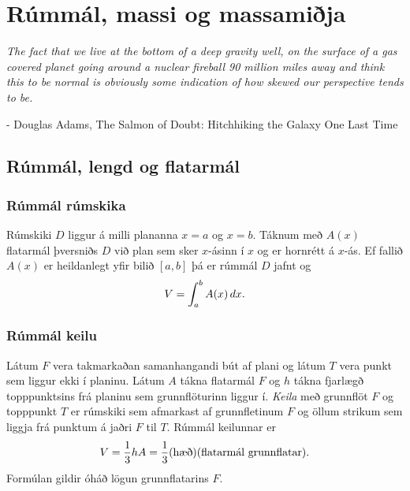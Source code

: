 \documentclass[b5paper,10pt,icelandic]{sphinxmanual}
\begin{document}
\chapter{Rúmmál, massi og massamiðja}
\label{kafli07::doc}\label{kafli07:rummal-massi-og-massamija}
\emph{The fact that we live at the bottom of a deep gravity well, on the surface of a
gas covered planet going around a nuclear fireball 90 million miles away and think
this to be normal is obviously some indication of how skewed our perspective tends to be.}

- Douglas Adams, The Salmon of Doubt: Hitchhiking the Galaxy One Last Time


\section{Rúmmál, lengd og flatarmál}
\label{kafli07:rummal-lengd-og-flatarmal}\label{kafli07:index-1}

\subsection{Rúmmál rúmskika}
\label{kafli07:rummal-rumskika}
Rúmskiki \(D\) liggur á milli plananna \(x=a\) og \(x=b\).
Táknum með \(A(x)\) flatarmál þversniðs \(D\) við plan sem sker
\(x\)-ásinn í \(x\) og er hornrétt á \(x\)-ás. Ef fallið
\(A(x)\) er heildanlegt yfir bilið \([a, b]\) þá er rúmmál
\(D\) jafnt og
\begin{gather}
\begin{split}V=\int_a^b A(x)\,dx.\end{split}\notag
\end{gather}

\subsection{Rúmmál keilu}
\label{kafli07:index-2}\label{kafli07:rummal-keilu}
Látum \(F\) vera takmarkaðan samanhangandi bút af plani og látum
\(T\) vera punkt sem liggur ekki í planinu. Látum \(A\) tákna
flatarmál \(F\) og \(h\) tákna fjarlægð topppunktsins frá
planinu sem grunnflöturinn liggur í. \textit{Keila} með grunnflöt \(F\) og
topppunkt \(T\) er rúmskiki sem afmarkast af grunnfletinum \(F\)
og öllum strikum sem liggja frá punktum á jaðri \(F\) til \(T\).
Rúmmál keilunnar er
\begin{gather}
\begin{split}V=\frac{1}{3}hA=\frac{1}{3}(\mbox{hæð})(\mbox{flatarmál
grunnflatar}).\end{split}\notag
\end{gather}
Formúlan gildir óháð lögun grunnflatarins \(F\).
\end{document}
